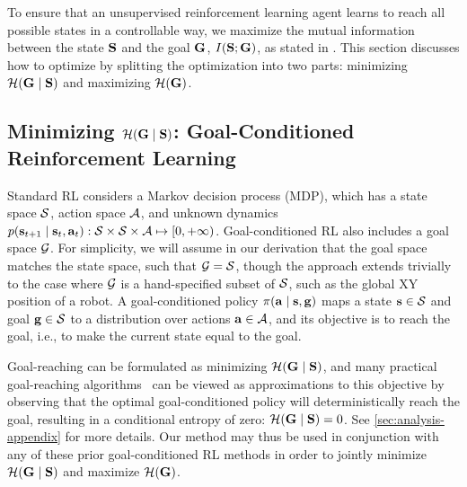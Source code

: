 To ensure that an unsupervised reinforcement learning agent learns to reach all possible states in a controllable way, we maximize the mutual information between the state ${\mathbf{S}}$ and the goal $\mathbf{G}$, $I({\mathbf{S}}; \mathbf{G})$, as stated in . This section discusses how to optimize  by splitting the optimization into two parts: minimizing ${\mathcal{H}}(\mathbf{G} \mid {\mathbf{S}})$ and maximizing ${\mathcal{H}}(\mathbf{G})$.

\subsection{Minimizing ${\mathcal{H}}(\mathbf{G} \mid {\mathbf{S}})$: Goal-Conditioned Reinforcement Learning}
Standard RL considers a Markov decision process (MDP), which has a state space ${\mathcal{S}}$, action space ${\mathcal{A}}$, and unknown dynamics $p(\mathbf{s}_{t+1} \mid \mathbf{s}_t, \mathbf{a}_t): {\mathcal{S}} \times {\mathcal{S}} \times {\mathcal{A}} \mapsto [0, +\infty)$.
Goal-conditioned RL also includes a goal space ${\mathcal{G}}$. For simplicity, we will assume in our derivation that the goal space matches the state space, such that ${\mathcal{G}} = {\mathcal{S}}$, though the approach extends trivially to the case where ${\mathcal{G}}$ is a hand-specified subset of ${\mathcal{S}}$, such as the global XY position of a robot.
A goal-conditioned policy $\pi(\mathbf{a} \mid \mathbf{s}, \mathbf{g})$ maps a state $\mathbf{s} \in {\mathcal{S}}$ and goal $\mathbf{g} \in {\mathcal{S}}$ to a distribution over actions $\mathbf{a} \in {\mathcal{A}}$, and its objective is to reach the goal, i.e., to make the current state equal to the goal.

Goal-reaching can be formulated as minimizing ${\mathcal{H}}(\mathbf{G} \mid {\mathbf{S}})$, and many practical goal-reaching algorithms~\citep{kaelbling1993goals,lillicrap2015continuous, schaul2015uva, andrychowicz2017her, nair2018rig, pong2018tdm,florensa2018selfsupervised} can be viewed as approximations to this objective by observing that the optimal goal-conditioned policy will deterministically reach the goal, resulting in a conditional entropy of zero: ${\mathcal{H}}(\mathbf{G} \mid {\mathbf{S}}) = 0$.
See \autoref{sec:analysis-appendix} for more details.
Our method may thus be used in conjunction with any of these prior goal-conditioned RL methods in order to jointly minimize ${\mathcal{H}}(\mathbf{G} \mid {\mathbf{S}})$ and maximize ${\mathcal{H}}(\mathbf{G})$.


